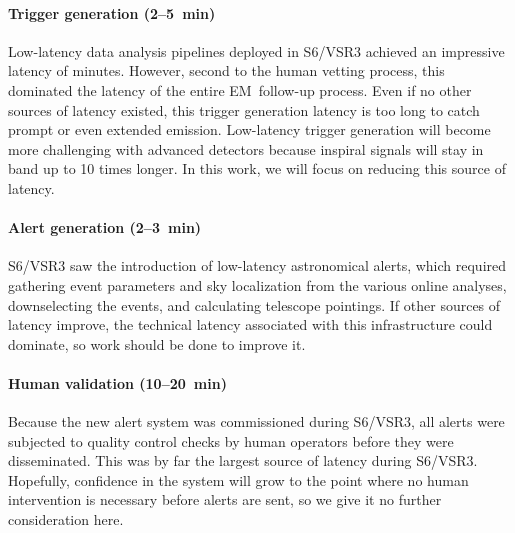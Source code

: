 \documentclass[preprint2]{aastex}
\newcommand{\EM}{EM}%
\begin{document}
\paragraph{Trigger generation (2--5~min)}%
Low-latency data analysis pipelines
deployed in S6/VSR3 achieved an impressive latency of minutes.  However, second
to the human vetting process, this dominated the latency of the entire \EM\
follow-up process.  Even if no other sources of latency existed, this trigger
generation latency is too long to catch prompt or even extended emission.
Low-latency trigger generation will become more challenging with advanced
detectors because inspiral signals will stay in band up to 10 times longer.  In
this work, we will focus on reducing this source of latency.

\paragraph{Alert generation (2--3~min)}%
S6/VSR3 saw the introduction of low-latency astronomical alerts, which required
gathering event parameters and sky localization from the various online
analyses, downselecting the events, and calculating telescope pointings.  If
other sources of latency improve, the technical latency associated with this
infrastructure could dominate, so work should be done to improve it.

\paragraph{Human validation (10--20~min)}%
Because the new alert system was commissioned during S6/VSR3, all alerts were
subjected to quality control checks by human operators before they were
disseminated. This was by far the largest source of latency during S6/VSR3.
Hopefully, confidence in the system will grow to the point where no human
intervention is necessary before alerts are sent, so we give it no further
consideration here.

\paragraph{}
\end{document}
